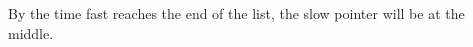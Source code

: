 \documentclass[preview]{standalone}
\begin{document}
By the time fast reaches the end of the list, the slow pointer will be at the middle.\\
\end{document}
